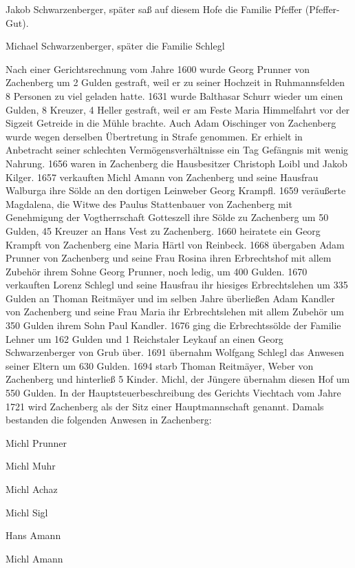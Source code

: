 Jakob Schwarzenberger, später saß auf diesem Hofe die Familie Pfeffer
(Pfeffer-Gut).

Michael Schwarzenberger, später die Familie Schlegl



Nach einer Gerichtsrechnung vom Jahre 1600 wurde Georg Prunner von Zachenberg um
2 Gulden gestraft, weil er zu seiner Hochzeit in Ruhmannsfelden 8 Personen zu
viel geladen hatte. 1631 wurde Balthasar Schurr wieder um einen Gulden, 8
Kreuzer, 4 Heller gestraft, weil er am Feste Maria Himmelfahrt vor der Sigzeit
Getreide in die Mühle brachte. Auch Adam Oischinger von Zachenberg wurde wegen
derselben Übertretung in Strafe genommen. Er erhielt in Anbetracht seiner
schlechten Vermögensverhältnisse ein Tag Gefängnis mit wenig Nahrung. 1656 waren
in Zachenberg die Hausbesitzer Christoph Loibl und Jakob Kilger. 1657 verkauften
Michl Amann von Zachenberg und seine Hausfrau Walburga ihre Sölde an den
dortigen Leinweber Georg Krampfl. 1659 veräußerte Magdalena, die Witwe des
Paulus Stattenbauer von Zachenberg mit Genehmigung der Vogtherrschaft Gotteszell
ihre Sölde zu Zachenberg um 50 Gulden, 45 Kreuzer an Hans Vest zu Zachenberg.
1660 heiratete ein Georg Krampft von Zachenberg eine Maria Härtl von Reinbeck.
1668 übergaben Adam Prunner von Zachenberg und seine Frau Rosina ihren
Erbrechtshof mit allem Zubehör ihrem Sohne Georg Prunner, noch ledig, um 400
Gulden. 1670 verkauften Lorenz Schlegl und seine Hausfrau ihr hiesiges
Erbrechtslehen um 335 Gulden an Thoman Reitmäyer und im selben Jahre überließen
Adam Kandler von Zachenberg und seine Frau Maria ihr Erbrechtslehen mit allem
Zubehör um 350 Gulden ihrem Sohn Paul Kandler. 1676 ging die Erbrechtssölde der
Familie Lehner um 162 Gulden und 1 Reichstaler Leykauf an einen Georg
Schwarzenberger von Grub über. 1691 übernahm Wolfgang Schlegl das Anwesen seiner
Eltern um 630 Gulden. 1694 starb Thoman Reitmäyer, Weber von Zachenberg und
hinterließ 5 Kinder. Michl, der Jüngere übernahm diesen Hof um 550 Gulden. In
der Hauptsteuerbeschreibung des Gerichts Viechtach vom Jahre 1721 wird
Zachenberg als der Sitz einer Hauptmannschaft genannt. Damals bestanden die
folgenden Anwesen in Zachenberg:



Michl Prunner

Michl Muhr

Michl Achaz

Michl Sigl

Hans Amann

Michl Amann


